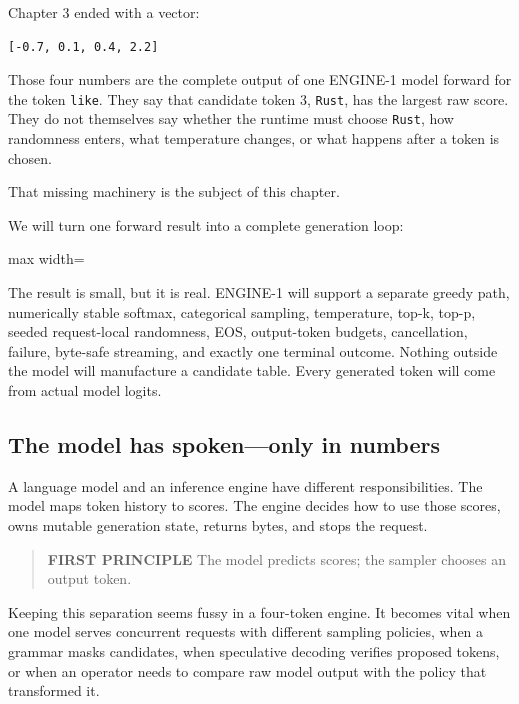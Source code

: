 \documentclass[
  10pt,
]{article}
\begin{document}
Chapter 3 ended with a vector:

\begin{verbatim}
[-0.7, 0.1, 0.4, 2.2]
\end{verbatim}

Those four numbers are the complete output of one ENGINE-1 model forward
for the token \texttt{like}. They say that candidate token 3,
\texttt{Rust}, has the largest raw score. They do not themselves say
whether the runtime must choose \texttt{Rust}, how randomness enters,
what temperature changes, or what happens after a token is chosen.

That missing machinery is the subject of this chapter.

We will turn one forward result into a complete generation loop:

\begin{center}\begin{adjustbox}{max width=\linewidth}\end{adjustbox}\end{center}

The result is small, but it is real. ENGINE-1 will support a separate
greedy path, numerically stable softmax, categorical sampling,
temperature, top-k, top-p, seeded request-local randomness, EOS,
output-token budgets, cancellation, failure, byte-safe streaming, and
exactly one terminal outcome. Nothing outside the model will manufacture
a candidate table. Every generated token will come from actual model
logits.

\subsection{The model has spoken---only in
numbers}\label{the-model-has-spokenonly-in-numbers}

A language model and an inference engine have different
responsibilities. The model maps token history to scores. The engine
decides how to use those scores, owns mutable generation state, returns
bytes, and stops the request.

\begin{quote}
\textbf{FIRST PRINCIPLE} The model predicts scores; the sampler chooses
an output token.
\end{quote}

Keeping this separation seems fussy in a four-token engine. It becomes
vital when one model serves concurrent requests with different sampling
policies, when a grammar masks candidates, when speculative decoding
verifies proposed tokens, or when an operator needs to compare raw model
output with the policy that transformed it.
\end{document}
